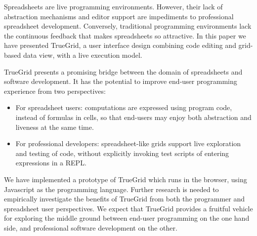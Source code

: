 \documentclass{llncs}
\begin{document}
Spreadsheets are live programming environments. However, their lack of abstraction mechanisms and editor support are impediments to professional spreadsheet development. Conversely, traditional programming environments lack the continuous feedback that makes spreadsheets so attractive. In this paper we have presented TrueGrid, a user interface design combining code editing and grid-based data view, with a live execution model.

TrueGrid presents a promising bridge between the domain of spreadsheets and software development. It has the potential to improve end-user programming experience from two perspectives:
\begin{itemize}
\item For spreadsheet users: computations are expressed using program code, instead of  formulas in cells, so that end-users may enjoy both abstraction and liveness at the same time.
\item For professional developers: spreadsheet-like grids support live exploration and testing of code, without explicitly invoking test scripts of entering expressions in a REPL.
\end{itemize}
We have implemented a prototype of TrueGrid which runs in the browser, using Javascript as the programming language. Further research is needed to empirically investigate the benefits of TrueGrid from both the programmer and spreadsheet user perspectives. 
We expect that TrueGrid provides a fruitful vehicle for exploring the middle ground between end-user programming on the one hand side, and professional software development on the other.




\end{document}
